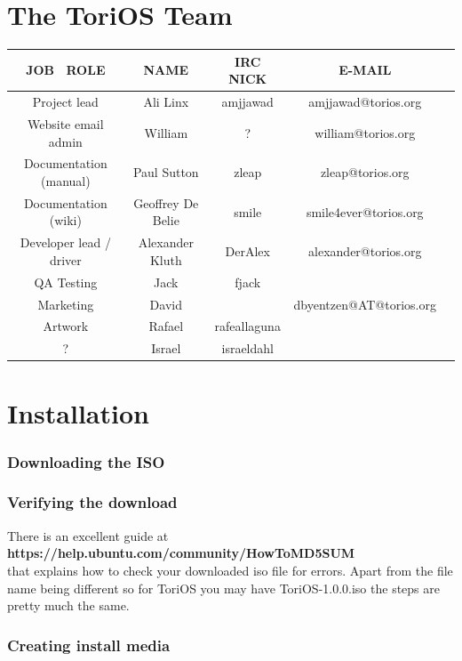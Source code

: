 \documentclass[12pt,a4paper]{book}
\begin{document}
\chapter{The ToriOS Team}

\begin{tabular}{|c|c|c|c|c|}
\hline  \textbf{JOB \ ROLE} & \textbf{NAME}  & \textbf{IRC NICK} & \textbf{E-MAIL}  \\ 
\hline  Project lead & Ali Linx  & amjjawad & amjjawad@torios.org  \\ 
\hline  Website email admin & William  & ? & william@torios.org  \\ 
\hline  Documentation (manual)  & Paul Sutton  & zleap  & zleap@torios.org \\ 
\hline  Documentation (wiki) & Geoffrey De Belie & smile  & smile4ever@torios.org  \\ 
\hline  Developer lead / driver & Alexander Kluth & DerAlex & alexander@torios.org \\ 
\hline  QA Testing & Jack  & fjack  &  \\ 
\hline  Marketing & David &  & dbyentzen@AT@torios.org \\
\hline Artwork & Rafael & rafeallaguna & \\
\hline ? & Israel & israeldahl & \\

\hline 
\end{tabular}


\chapter{Installation}



\subsection{Downloading the ISO}


\subsection{Verifying the download}
There is an excellent guide at\\ \textbf{https://help.ubuntu.com/community/HowToMD5SUM} \\
that explains how to check your downloaded iso file for errors.  Apart from the file name being different so for ToriOS you may have ToriOS-1.0.0.iso the steps are pretty much the same.  
\subsection{Creating install media}
\end{document}
